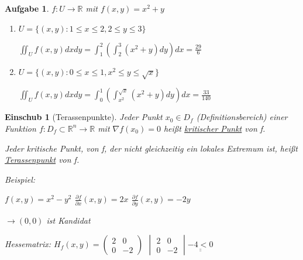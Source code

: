 \documentclass[12pt,a4paper]{scrreprt}
\newtheorem{aufg}[defi]{Aufgabe}
\newtheorem*{einschub}{Einschub}
\begin{document}
	\begin{aufg}
		$f:U\to\mathbb{R}$ mit $f(x,y)=x^2+y$

		\begin{enumerate}[label=\emph{(\roman*)}]
			\item $U=\{(x,y):1 \leq x \leq 2, 2 \leq y \leq 3\}$
			

			$\iint_U f(x,y)dxdy=\int_1^2 \left(\int_2^3 (x^2+y) dy\right)dx = \frac{29}{6}$

			\item $U=\{(x,y):0 \leq x \leq 1, x^2 \leq y \leq \sqrt{x}\}$
			

			$\iint_U f(x,y)dxdy=\int_0^1 \left(\int_{x^2}^{\sqrt{x}} (x^2+y) dy\right)dx = \frac{33}{140}$
		\end{enumerate}
	\end{aufg}

	\begin{einschub}[Terassenpunkte]
		Jeder Punkt $x_0\in D_f$ (Definitionsbereich) einer Funktion $f:D_f\subset\mathbb{R}^n\to\mathbb{R}$ mit $\nabla f(x_0)=0$ heißt \underline{kritischer Punkt} von f.

		Jeder kritische Punkt, von f, der nicht gleichzeitig ein lokales Extremum ist, heißt \underline{Terassenpunkt} von f.

		Beispiel:

		$f(x,y)=x^2-y^2$	$\frac{\partial f}{\partial x}(x,y)=2x$	$\frac{\partial f}{\partial y}(x,y)=-2y$

		$\to (0,0)$ ist Kandidat

		Hessematrix: $H_f(x,y)=\begin{pmatrix}2 & 0 \\ 0 & -2\end{pmatrix}$ $\begin{vmatrix}2 & 0 \\ 0 & -2\end{vmatrix}\underline{\underline{-4<0}}$

	\end{einschub}
	
\end{document}
